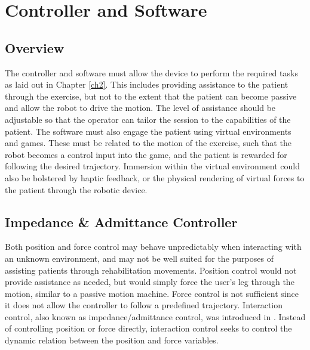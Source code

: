 \documentclass[12pt]{report}
\begin{document}
\afterpage{\null\newpage}	
\chapter{Controller and Software} \label{ch3}


	\section{Overview}
	
	The controller and software must allow the device to perform the required tasks as laid out in Chapter \ref{ch2}. This includes providing assistance to the patient through the exercise, but not to the extent that the patient can become passive and allow the robot to drive the motion. The level of assistance should be adjustable so that the operator can tailor the session to the capabilities of the patient. The software must also engage the patient using virtual environments and games. These must be related to the motion of the exercise, such that the robot becomes a control input into the game, and the patient is rewarded for following the desired trajectory. Immersion within the virtual environment could also be bolstered by haptic feedback, or the physical rendering of virtual forces to the patient through the robotic device. 
	

	
	\section{Impedance \& Admittance Controller} \label{Sec:imp}

%

Both position and force control may behave unpredictably when interacting with an unknown environment, and may not be well suited for the purposes of assisting patients through rehabilitation movements. Position control would not provide assistance as needed, but would simply force the user's leg through the motion, similar to a passive motion machine. Force control is not sufficient since it does not allow the controller to follow a predefined trajectory. Interaction control, also known as impedance/admittance control, was introduced in \cite{Hogan1985}. Instead of controlling position or force directly, interaction control seeks to control the dynamic relation between the position and force variables. 
	
\end{document}
